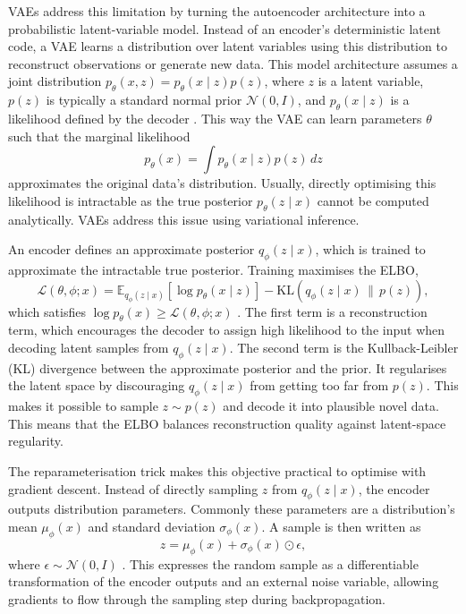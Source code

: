 \Glspl{VAE} address this limitation by turning the autoencoder architecture into a probabilistic latent-variable model. Instead of an encoder's deterministic latent code, a VAE learns a distribution over latent variables using this distribution to reconstruct observations or generate new data. This model architecture assumes a joint distribution \(p_\theta(x,z)=p_\theta(x\mid z)p(z)\), where \(z\) is a latent variable, \(p(z)\) is typically a standard normal prior \(\mathcal{N}(0,I)\), and \(p_\theta(x\mid z)\) is a likelihood defined by the decoder \cite{Kingma2013AutoEncodingVB}. This way the VAE can learn parameters \(\theta\) such that the marginal likelihood
\begin{equation}
    p_\theta(x) = \int p_\theta(x \mid z)p(z)\,dz
\end{equation}
approximates the original data's distribution. Usually, directly optimising this likelihood is intractable as the true posterior \(p_\theta(z\mid x)\) cannot be computed analytically. VAEs address this issue using variational inference.

An encoder defines an approximate posterior \(q_\phi(z\mid x)\), which is trained to approximate the intractable true posterior. Training maximises the \gls{ELBO},
\begin{equation}
    \mathcal{L}(\theta,\phi; x) = \mathbb{E}_{q_\phi(z \mid x)} \left[ \log p_\theta(x \mid z) \right] - \mathrm{KL}\!\left(q_\phi(z \mid x) \,\|\, p(z)\right),
\end{equation}
which satisfies \(\log p_\theta(x) \geq \mathcal{L}(\theta,\phi;x)\) \cite{Kingma2013AutoEncodingVB}. The first term is a reconstruction term, which encourages the decoder to assign high likelihood to the input when decoding latent samples from \(q_\phi(z\mid x)\). The second term is the Kullback-Leibler (KL) divergence between the approximate posterior and the prior. It regularises the latent space by discouraging \(q_\phi(z\mid x)\) from getting too far from \(p(z)\). This makes it possible to sample \(z\sim p(z)\) and decode it into plausible novel data. This means that the ELBO balances reconstruction quality against latent-space regularity.

The reparameterisation trick makes this objective practical to optimise with gradient descent. Instead of directly sampling \(z\) from \(q_\phi(z\mid x)\), the encoder outputs distribution parameters. Commonly these parameters are a distribution's mean \(\mu_\phi(x)\) and standard deviation \(\sigma_\phi(x)\). A sample is then written as
\begin{equation}
    z = \mu_\phi(x) + \sigma_\phi(x) \odot \epsilon,
\end{equation}
where \(\epsilon \sim \mathcal{N}(0,I)\) \cite{Kingma2013AutoEncodingVB}. This expresses the random sample as a differentiable transformation of the encoder outputs and an external noise variable, allowing gradients to flow through the sampling step during backpropagation.

